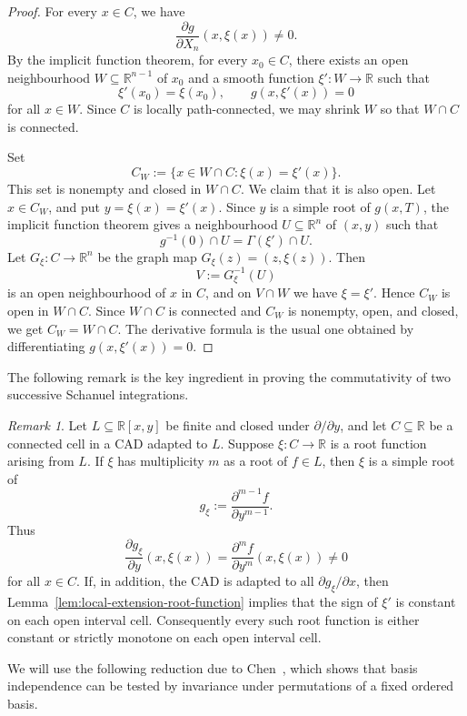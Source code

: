 \documentclass[11pt]{article}
\theoremstyle{remark}
\newtheorem{remark}{Remark}
\newcommand{\1}{\mathbf 1}
\begin{document}
\begin{proof}
For every \(x\in C\), we have
\[
  \frac{\partial g}{\partial X_n}(x,\xi(x))\neq 0.
\]
By the implicit function theorem, for every \(x_0\in C\), there exists an open
neighbourhood \(W\subseteq \mathbb{R}^{n-1}\) of \(x_0\) and a smooth function
\(\xi':W\to\mathbb{R}\) such that
\[
  \xi'(x_0)=\xi(x_0),
  \qquad
  g(x,\xi'(x))=0
\]
for all \(x\in W\).  Since \(C\) is locally path-connected, we may shrink \(W\)
so that \(W\cap C\) is connected.

Set
\[
  C_W:=\{x\in W\cap C:\xi(x)=\xi'(x)\}.
\]
This set is nonempty and closed in \(W\cap C\).  We claim that it is also open.
Let \(x\in C_W\), and put \(y=\xi(x)=\xi'(x)\).  Since \(y\) is a simple root
of \(g(x,T)\), the implicit function theorem gives a neighbourhood
\(U\subseteq \mathbb{R}^n\) of \((x,y)\) such that
\[
  g^{-1}(0)\cap U
  =
  \Gamma(\xi')\cap U .
\]
Let \(G_\xi:C\to\mathbb{R}^n\) be the graph map
\(G_\xi(z)=(z,\xi(z))\).  Then
\[
  V:=G_\xi^{-1}(U)
\]
is an open neighbourhood of \(x\) in \(C\), and on \(V\cap W\) we have
\(\xi=\xi'\).  Hence \(C_W\) is open in \(W\cap C\).  Since \(W\cap C\) is
connected and \(C_W\) is nonempty, open, and closed, we get
\(C_W=W\cap C\).  The derivative formula is the usual one obtained by
differentiating \(g(x,\xi'(x))=0\).
\end{proof}

The following remark is the key ingredient in proving the commutativity of two successive Schanuel integrations.
\begin{remark}
\label{rem:monotone-root-functions}
Let \(L\subseteq \mathbb{R}[x,y]\) be finite and closed under
\(\partial/\partial y\), and let \(C\subseteq\mathbb{R}\) be a connected cell in
a CAD adapted to \(L\).  Suppose \(\xi:C\to\mathbb{R}\) is a root function
arising from \(L\).  If \(\xi\) has multiplicity \(m\) as a root of
\(f\in L\), then \(\xi\) is a simple root of
\[
  g_\xi
  :=
  \frac{\partial^{m-1}f}{\partial y^{m-1}}.
\]
Thus
\[
  \frac{\partial g_\xi}{\partial y}(x,\xi(x))
  =
  \frac{\partial^m f}{\partial y^m}(x,\xi(x))
  \neq 0
\]
for all \(x\in C\).  If, in addition, the CAD is adapted to all
\(\partial g_\xi/\partial x\), then Lemma~\ref{lem:local-extension-root-function}
implies that the sign of \(\xi'\) is constant on each open interval cell.
Consequently every such root function is either constant or strictly monotone
on each open interval cell.
\end{remark}

We will use the following reduction due to Chen~\cite{chen1993euler}, which shows that basis independence can be tested by invariance under permutations of a fixed ordered basis.
\end{document}
